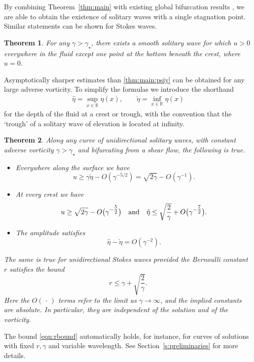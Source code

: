 \documentclass[pdflatex,sn-mathphys-num]{sn-jnl}%
\numberwithin{equation}{section}
\theoremstyle{thmstyleone}
\newtheorem{theorem}{Theorem}
\newcommand{\R}{\mathbb{R}}
\begin{document}
By combining Theorem~\ref{thm:main} with existing global bifurcation results \cite{Haziot2023}, we are able to obtain the existence of solitary waves with a single stagnation point. Similar statements can be shown for Stokes waves.

\begin{theorem}\label{thm:main2}
  For any $\gamma > \gamma_\star$, there exists a smooth solitary wave for which $u > 0$ everywhere in the fluid except one point at the bottom beneath the crest, where $u = 0$.
\end{theorem}

Asymptotically sharper estimates than \eqref{thm:main:psiy} can be obtained for any large adverse vorticity. To simplify the formulas we introduce the shorthand
\begin{align*}
  \hat \eta = \sup_{x \in \R} \eta(x),
  \qquad 
  \check \eta = \inf_{x \in \R} \eta(x)
\end{align*}
for the depth of the fluid at a crest or trough, with the convention that the `trough' of a solitary wave of elevation is located at infinity.

\begin{theorem}\label{thm:main1}
  Along any curve of unidirectional solitary waves, with constant adverse vorticity $\gamma>\gamma_\star$ and bifurcating from a shear flow, the following is true.
  \begin{itemize}
  \item[(i)] Everywhere along the surface we have
    \[
      u \geq \gamma \check{\eta} - O(\gamma^{-5/2}) = \sqrt{2\gamma} - O(\gamma^{-1}).
    \]
  \item[(ii)] At every crest we have
    \[
      u \geq \sqrt{2\gamma} - O\big(\gamma^{-\tfrac52}\big)
      \quad \textup{and} \quad 
      \hat{\eta} \leq \sqrt{\frac{2}{\gamma}} + O\big(\gamma^{-\tfrac72}\big).
    \]
  \item[(iii)] The amplitude satisfies
    \[	
    \hat{\eta} - \check{\eta} = O(\gamma^{-2}).
    \]
  \end{itemize}
  The same is true for unidirectional Stokes waves provided the Bernoulli constant $r$ satisfies the bound
  \begin{equation} \label{eqn:rbound}
    r \le \gamma + \sqrt{\frac 2\gamma}.
  \end{equation}
  Here the $O(\,\cdot\,)$ terms refer to the limit as $\gamma \to \infty$, and the implied constants are absolute. In particular, they are independent of the solution and of the vorticity.
\end{theorem}
The bound \eqref{eqn:rbound} automatically holds, for instance, for curves of solutions with fixed $r,\gamma$ and variable wavelength. See Section~\ref{s:preliminaries} for more details.
\end{document}
